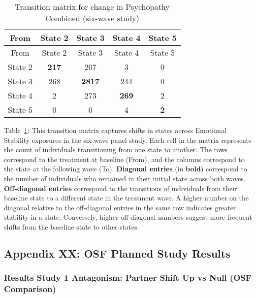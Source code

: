 \documentclass[
  single column]{article}
\begin{document}
\begin{longtable}[]{@{}ccccc@{}}
\caption{Transition matrix for change in Psychopathy Combined (six-wave
study)}\label{tbl-table-transition-psychopathy-combined-long}\tabularnewline
\toprule\noalign{}
From & State 2 & State 3 & State 4 & State 5 \\
\midrule\noalign{}
\endfirsthead
\toprule\noalign{}
From & State 2 & State 3 & State 4 & State 5 \\
\midrule\noalign{}
\endhead
\bottomrule\noalign{}
\endlastfoot
State 2 & \textbf{217} & 207 & 3 & 0 \\
State 3 & 268 & \textbf{2817} & 244 & 0 \\
State 4 & 2 & 273 & \textbf{269} & 2 \\
State 5 & 0 & 0 & 4 & \textbf{2} \\
\end{longtable}

Table~\ref{tbl-table-transition-psychopathy-combined-long}: This
transition matrix captures shifts in states across Emotional Stability
exposures in the six-wave panel study. Each cell in the matrix
represents the count of individuals transitioning from one state to
another. The rows correspond to the treatment at baseline (From), and
the columns correspond to the state at the following wave (To).
\textbf{Diagonal entries} (in \textbf{bold}) correspond to the number of
individuals who remained in their initial state across both waves.
\textbf{Off-diagonal entries} correspond to the transitions of
individuals from their baseline state to a different state in the
treatment wave. A higher number on the diagonal relative to the
off-diagonal entries in the same row indicates greater stability in a
state. Conversely, higher off-diagonal numbers suggest more frequent
shifts from the baseline state to other states.

\newpage{}

\subsection{Appendix XX: OSF Planned Study Results}\label{appendix-xx}

\subsubsection{Results Study 1 Antagonism: Partner Shift Up vs Null (OSF
Comparison)}\label{results-study-1-antagonism-partner-shift-up-vs-null-osf-comparison}
\end{document}
